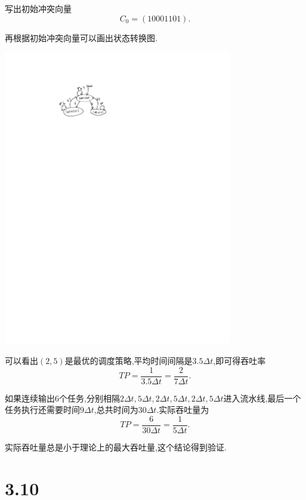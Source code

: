 \documentclass[adobefonts, nocap]{ctexart}
\begin{document}
    写出初始冲突向量
    \[
      C_{0}=(10001101).
    \]

    再根据初始冲突向量可以画出状态转换图.

    \begin{center}
      \includegraphics[width=10cm]{2-crop.pdf}
    \end{center}

    可以看出$(2,5)$是最优的调度策略,平均时间间隔是$3.5\Delta t$,即可得吞吐率
    \[
      TP=\frac{1}{3.5\Delta t}=\frac{2}{7\Delta t}.
    \]

    如果连续输出$6$个任务,分别相隔$2\Delta t, 5\Delta t, 2\Delta t, 5\Delta t, 2\Delta t, 5\Delta t$进入流水线,最后一个任务执行还需要时间$9\Delta t$,总共时间为$30\Delta t$.实际吞吐量为
    \[
      TP=\frac{6}{30\Delta t}=\frac{1}{5\Delta t}.
    \]
    
    实际吞吐量总是小于理论上的最大吞吐量,这个结论得到验证.
  \section*{3.10}
\end{document}
